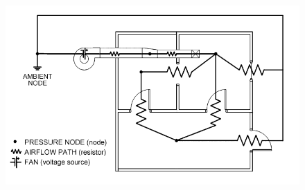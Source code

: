 \begin{figure}[H]
\includegraphics[width=\textwidth]{images/NAF_example.png}
\caption{}
\label{NAF}
\end{figure}
